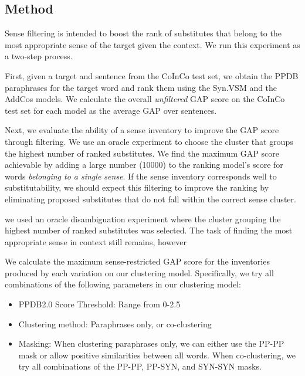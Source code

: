 \documentclass[11pt]{article}
\begin{document}
\subsection{Method}

Sense filtering is intended to boost the  rank of substitutes that belong to the most appropriate sense of the target given the context. We run this experiment as a two-step process.

First, given a target and sentence from the CoInCo test set, we obtain the PPDB paraphrases for the target word and rank them using the Syn.VSM and the AddCos models. We calculate the overall \textit{unfiltered} GAP score on the CoInCo test set for each model as the average GAP over sentences.

Next, we evaluate the ability of a sense inventory to improve the GAP score through filtering. We use an oracle experiment to choose the cluster that groups the highest number of ranked substitutes. We find the maximum GAP score achievable by adding a large number (10000) to the ranking model's score for words \textit{belonging to a single sense}. 
If the sense inventory corresponds well to substitutability, we should expect this filtering to improve the ranking by eliminating proposed substitutes that do not fall within the correct sense cluster.

we used an oracle disambiguation experiment where the cluster grouping the highest number of ranked substitutes was selected. The task of finding the most appropriate sense in context still remains, however 


We calculate the maximum sense-restricted GAP score for the inventories produced by each variation on our clustering model. Specifically, we try all combinations of the following parameters in our clustering model:

\begin{itemize}
	\item PPDB2.0 Score Threshold: Range from 0-2.5
	\item Clustering method: Paraphrases only, or co-clustering
	\item Masking: When clustering paraphrases only, we can either use the PP-PP mask or allow positive similarities between all words. When co-clustering, we try all combinations of the PP-PP, PP-SYN, and SYN-SYN masks.
\end{itemize}
\end{document}
